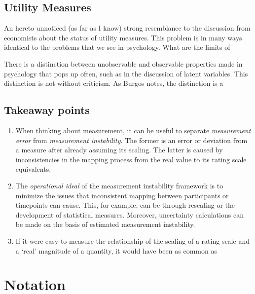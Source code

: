 \documentclass[utf8]{FrontiersinVancouver}
\begin{document}
\subsection{Utility Measures}
An hereto unnoticed (as far as I know) strong resemblance to the discussion from economists about the status of utility measures. This problem is in many ways  identical to the problems that we see in psychology. What are the limits of 

There is a distinction between unobservable and observable properties made in psychology that pops up often, such as in the discussion of latent variables. This distinction is not without criticism. As Burgos notes, the distinction is a \citep{burgosRealProblemHypothetical2021}

\subsection{Takeaway points}
\begin{enumerate}
    \item{When thinking about measurement, it can be useful to separate \textit{measurement error} from \textit{measurement instability}. The former is an error or deviation from a measure after already assuming its scaling. The latter is caused by inconsistencies in the mapping process from the real value to its rating scale equivalents.}
    \item{The \textit{operational ideal} of the measurement instability framework is to minimize the issues that inconsistent mapping between participants or timepoints can cause. This, for example, can be through rescaling or the development of statistical measures. Moreover, uncertainty calculations can be made on the basis of estimated measurement instability.}
    \item{If it were easy to measure the relationship of the scaling of a rating scale and a `real' magnitude of a quantity, it would have been as common as }
\end{enumerate}


\section*{Notation}
\end{document}
